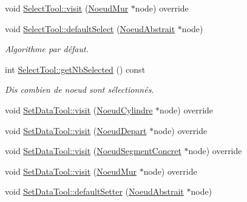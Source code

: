 \begin{DoxyCompactItemize}
\item 
void \hyperlink{group__inf2990_gab6a7d46d8fad7c1045678b6dec3c9400}{Select\-Tool\-::visit} (\hyperlink{class_noeud_mur}{Noeud\-Mur} $\ast$node) override
\item 
void \hyperlink{group__inf2990_ga01b8ec1322baa74ee48e5087337bc959}{Select\-Tool\-::default\-Select} (\hyperlink{class_noeud_abstrait}{Noeud\-Abstrait} $\ast$node)
\begin{DoxyCompactList}\small\item\em Algorithme par défaut. \end{DoxyCompactList}\item 
int \hyperlink{group__inf2990_gaca4f60cc972b5d9df612f48c18c8364a}{Select\-Tool\-::get\-Nb\-Selected} () const 
\begin{DoxyCompactList}\small\item\em Dis combien de noeud sont sélectionnés. \end{DoxyCompactList}\item 
void \hyperlink{group__inf2990_gaab929a1ed9e3f6a2e80a15aef5de8f71}{Set\-Data\-Tool\-::visit} (\hyperlink{class_noeud_cylindre}{Noeud\-Cylindre} $\ast$node) override
\item 
void \hyperlink{group__inf2990_gabe996cec1a80bdb4a10383bf4716532d}{Set\-Data\-Tool\-::visit} (\hyperlink{class_noeud_depart}{Noeud\-Depart} $\ast$node) override
\item 
void \hyperlink{group__inf2990_ga5c1484b543077d2a267347edff94266c}{Set\-Data\-Tool\-::visit} (\hyperlink{class_noeud_segment_concret}{Noeud\-Segment\-Concret} $\ast$node) override
\item 
void \hyperlink{group__inf2990_ga5833b6797fd9a603bedd502431fc76cc}{Set\-Data\-Tool\-::visit} (\hyperlink{class_noeud_mur}{Noeud\-Mur} $\ast$node) override
\item 
\hypertarget{group__inf2990_ga410f169c9f53a3a018bce606e0ba9f23}{void \hyperlink{group__inf2990_ga410f169c9f53a3a018bce606e0ba9f23}{Set\-Data\-Tool\-::default\-Setter} (\hyperlink{class_noeud_abstrait}{Noeud\-Abstrait} $\ast$node)}\label{group__inf2990_ga410f169c9f53a3a018bce606e0ba9f23}


\end{DoxyCompactItemize}
